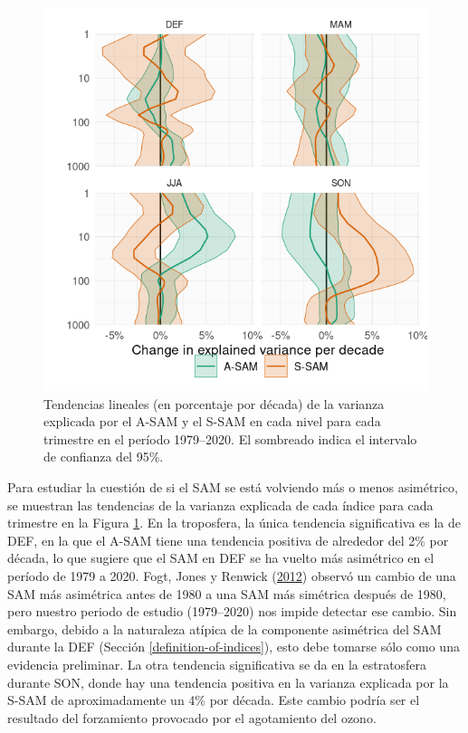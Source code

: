 \documentclass[12pt,oneside,a4paper]{reedthesis}
\begin{document}
\begin{figure}

{\centering \includegraphics{figures/30-sam/r-squared-trend-1} 

}

\caption{Tendencias lineales (en porcentaje por década) de la varianza explicada por el A-SAM y el S-SAM en cada nivel para cada trimestre en el período 1979--2020. El sombreado indica el intervalo de confianza del 95\%.}\label{fig:r-squared-trend}
\end{figure}

Para estudiar la cuestión de si el SAM se está volviendo más o menos asimétrico, se muestran las tendencias de la varianza explicada de cada índice para cada trimestre en la Figura \ref{fig:r-squared-trend}.
En la troposfera, la única tendencia significativa es la de DEF, en la que el A-SAM tiene una tendencia positiva de alrededor del 2\% por década, lo que sugiere que el SAM en DEF se ha vuelto más asimétrico en el período de 1979 a 2020.
Fogt, Jones y Renwick (\protect\hyperlink{ref-fogt2012}{2012}) observó un cambio de una SAM más asimétrica antes de 1980 a una SAM más simétrica después de 1980, pero nuestro periodo de estudio (1979--2020) nos impide detectar ese cambio.
Sin embargo, debido a la naturaleza atípica de la componente asimétrica del SAM durante la DEF (Sección \ref{definition-of-indices}), esto debe tomarse sólo como una evidencia preliminar.
La otra tendencia significativa se da en la estratosfera durante SON, donde hay una tendencia positiva en la varianza explicada por la S-SAM de aproximadamente un 4\% por década.
Este cambio podría ser el resultado del forzamiento provocado por el agotamiento del ozono.
\end{document}
